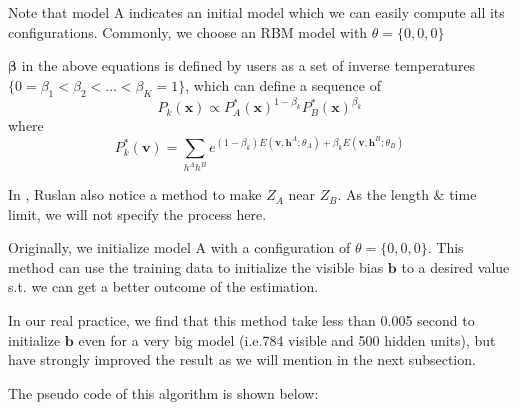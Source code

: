 Note that model A indicates an initial model which we can easily compute all its configurations. Commonly, we choose an RBM model with $\theta = \{0,0,0\}$

$\mathbf \beta$ in the above equations is defined by users as a set of inverse temperatures $\{0= \beta_{1} < \beta_{2} < ... < \beta_{K} =1\}$, which can define a sequence of
\begin{equation}
P_{k}(\mathbf x) \propto P_{A}^{*}(\mathbf x)^{1-\beta_{k}} P_{B}^{*}(\mathbf x)^{\beta_{k}}
\end{equation}
where 
\begin{equation}
P^{*}_{k}(\mathbf v)=\sum_{h^{A}h^{B}}e^{(1-\beta_{k})E(\mathbf v, \mathbf h^{A};\theta_{A})+\beta_{k}E(\mathbf v,\mathbf h^{B};\theta_{B})}
\end{equation}


In \cite{salakhutdinov2009learning}, Ruslan also notice a method to make $Z_{A}$ near $Z_{B}$. As the length \& time limit, we will not specify the process here.

Originally, we initialize model A with a configuration of $\theta=\{0,0,0\}$. This method can use the training data to initialize the visible bias $\mathbf b$ to a desired value s.t. we can get a better outcome of the estimation.

In our real practice, we find that this method take less than 0.005 second to initialize $\mathbf b$ even for a very big model (i.e.784 visible and 500 hidden units), but have strongly improved the result as we will mention in the next subsection.


The pseudo code of this algorithm is shown below:

